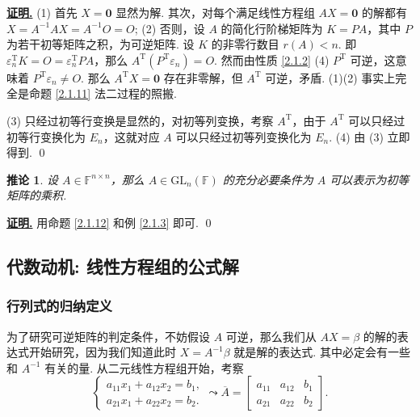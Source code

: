 \documentclass[10pt,openany]{article}
\theoremstyle{thmstyle} %
\theoremstyle{defstyle} %
\newtheorem{corollary}[theorem]{推论}
\theoremstyle{prostyle} %
\theoremstyle{exastyle}
\theoremstyle{remstyle}
\renewenvironment{proof}[1][证明]{\par\underline{\textbf{#1.}} \;\fangsong}{\qed\par}
\newcommand{\T}{^{\text{T}}}
\newcommand{\F}{\mathbb{F}}
\newcommand{\gfn}{\text{GL}_n(\mathbb{F})}
\newcommand{\n}{^{n \times n}}
\begin{document}
\begin{proof}
	(1) 首先 \( X=\bm{0} \) 显然为解. 其次，对每个满足线性方程组 \( AX=\bm{0} \) 的解都有 \( X=A^{-1}AX=A^{-1}O=O \);
	(2) 否则，设 \( A \) 的简化行阶梯矩阵为 \( K=PA \)，其中 \( P \) 为若干初等矩阵之积，为可逆矩阵. 设 \( K \) 的非零行数目 \( r(A)<n \). 即 \( \varepsilon_n\T K=O= \varepsilon_n\T PA \)，那么 \( A\T(P\T \varepsilon_n)=O \). 然而由性质 \ref{2.1.2} (4) \( P\T \) 可逆，这意味着 \( P\T \varepsilon_n \neq O \). 那么 \( A\T X=\bm{0} \) 存在非零解，但 \( A\T \) 可逆，矛盾. (1)(2) 事实上完全是命题 \ref{2.1.11} 法二过程的照搬.
	
	\vspace{1ex}
	
    (3) 只经过初等行变换是显然的，对初等列变换，考察 \( A\T \)，由于 \( A\T \) 可以只经过初等行变换化为 \( E_n \)，这就对应 \( A \) 可以只经过初等列变换化为 \( E_n \). (4) 由 (3) 立即得到.
\end{proof}

\begin{corollary}	\label{2.1.13}
	设 \( A \in \F\n \)，那么 \( A \in \gfn \) 的充分必要条件为 \( A \) 可以表示为初等矩阵的乘积.

\end{corollary}

\begin{proof}
	用命题 \ref{2.1.12} 和例 \ref{2.1.3} 即可.
\end{proof}

\subsection{代数动机: 线性方程组的公式解}

\subsubsection{行列式的归纳定义}
为了研究可逆矩阵的判定条件，不妨假设 \( A \) 可逆，那么我们从 \( AX=\beta \) 的解的表达式开始研究，因为我们知道此时 \( X=A^{-1}\beta \) 就是解的表达式. 其中必定会有一些和 \( A^{-1} \) 有关的量. 从二元线性方程组开始，考察
\[ \left\{ \begin{array}{l}
	a_{11}x_1+a_{12}x_2=b_1, \\
	a_{21}x_1+a_{22}x_2=b_2.
\end{array}\right. \leadsto \overline{A}=\begin{bmatrix}
 a_{11} & a_{12} & b_1 \\
 a_{21} & a_{22} & b_2
\end{bmatrix}. \]
\end{document}
